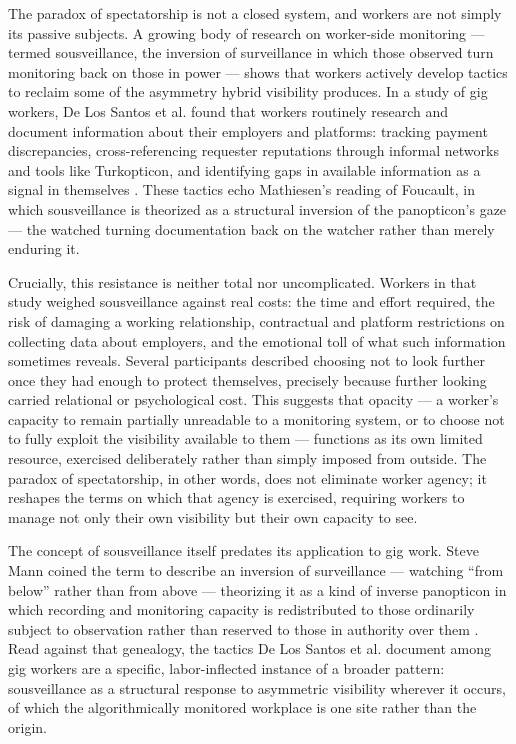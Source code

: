 \documentclass[12pt, a4paper]{article}
\begin{document}
The paradox of spectatorship is not a closed system, and workers are not simply its passive subjects. A growing body of research on worker-side monitoring --- termed sousveillance, the inversion of surveillance in which those observed turn monitoring back on those in power --- shows that workers actively develop tactics to reclaim some of the asymmetry hybrid visibility produces. In a study of gig workers, De Los Santos et al. found that workers routinely research and document information about their employers and platforms: tracking payment discrepancies, cross-referencing requester reputations through informal networks and tools like Turkopticon, and identifying gaps in available information as a signal in themselves \parencite{delossantos2024designing}. These tactics echo Mathiesen's reading of Foucault, in which sousveillance is theorized as a structural inversion of the panopticon's gaze --- the watched turning documentation back on the watcher rather than merely enduring it.

Crucially, this resistance is neither total nor uncomplicated. Workers in that study weighed sousveillance against real costs: the time and effort required, the risk of damaging a working relationship, contractual and platform restrictions on collecting data about employers, and the emotional toll of what such information sometimes reveals. Several participants described choosing not to look further once they had enough to protect themselves, precisely because further looking carried relational or psychological cost. This suggests that opacity --- a worker's capacity to remain partially unreadable to a monitoring system, or to choose not to fully exploit the visibility available to them --- functions as its own limited resource, exercised deliberately rather than simply imposed from outside. The paradox of spectatorship, in other words, does not eliminate worker agency; it reshapes the terms on which that agency is exercised, requiring workers to manage not only their own visibility but their own capacity to see.

The concept of sousveillance itself predates its application to gig work. Steve Mann coined the term to describe an inversion of surveillance --- watching ``from below'' rather than from above --- theorizing it as a kind of inverse panopticon in which recording and monitoring capacity is redistributed to those ordinarily subject to observation rather than reserved to those in authority over them \parencite{mann2004sousveillance}. Read against that genealogy, the tactics De Los Santos et al. document among gig workers are a specific, labor-inflected instance of a broader pattern: sousveillance as a structural response to asymmetric visibility wherever it occurs, of which the algorithmically monitored workplace is one site rather than the origin.
\end{document}
